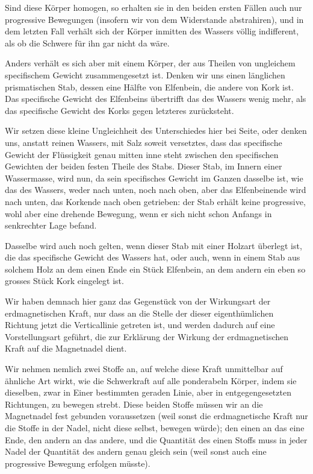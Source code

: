 \documentclass[12pt,a4paper]{article}
\begin{document}
Sind diese Körper homogen, so erhalten sie in den beiden ersten Fällen auch nur progressive Bewegungen (insofern wir von dem Widerstande abstrahiren), und in dem letzten Fall verhält sich der Körper inmitten des Wassers völlig indifferent, als ob die Schwere für ihn gar nicht da wäre.

Anders verhält es sich aber mit einem Körper, der aus Theilen von ungleichem specifischem Gewicht zusammengesetzt ist. Denken wir uns einen länglichen prismatischen Stab, dessen eine Hälfte von Elfenbein, die andere von Kork ist. Das specifische Gewicht des Elfenbeins übertrifft das des Wassers wenig mehr, als das specifische Gewicht des Korks gegen letzteres zurücksteht.

Wir setzen diese kleine Ungleichheit des Unterschiedes hier bei Seite, oder denken uns, anstatt reinen Wassers, mit Salz soweit versetztes, dass das specifische Gewicht der Flüssigkeit genau mitten inne steht zwischen den specifischen Gewichten der beiden festen Theile des Stabs. Dieser Stab, im Innern einer Wassermasse, wird nun, da sein specifisches Gewicht im Ganzen dasselbe ist, wie das des Wassers, weder nach unten, noch nach oben, aber das Elfenbeinende wird nach unten, das Korkende nach oben getrieben: der Stab erhält keine progressive, wohl aber eine drehende Bewegung, wenn er sich nicht schon Anfangs in senkrechter Lage befand.

Dasselbe wird auch noch gelten, wenn dieser Stab mit einer Holzart überlegt ist, die das specifische Gewicht des Wassers hat, oder auch, wenn in einem Stab aus solchem Holz an dem einen Ende ein Stück Elfenbein, an dem andern ein eben so grosses Stück Kork eingelegt ist.

Wir haben demnach hier ganz das Gegenstück von der Wirkungsart der erdmagnetischen Kraft, nur dass an die Stelle der dieser eigenthümlichen Richtung jetzt die Verticallinie getreten ist, und werden dadurch auf eine Vorstellungsart geführt, die zur Erklärung der Wirkung der erdmagnetischen Kraft auf die Magnetnadel dient.

Wir nehmen nemlich zwei Stoffe an, auf welche diese Kraft unmittelbar auf ähnliche Art wirkt, wie die Schwerkraft auf alle ponderabeln Körper, indem sie dieselben, zwar in Einer bestimmten geraden Linie, aber in entgegengesetzten Richtungen, zu bewegen strebt. Diese beiden Stoffe müssen wir an die Magnetnadel fest gebunden voraussetzen (weil sonst die erdmagnetische Kraft nur die Stoffe in der Nadel, nicht diese selbst, bewegen würde); den einen an das eine Ende, den andern an das andere, und die Quantität des einen Stoffs muss in jeder Nadel der Quantität des andern genau gleich sein (weil sonst auch eine progressive Bewegung erfolgen müsste).
\end{document}
